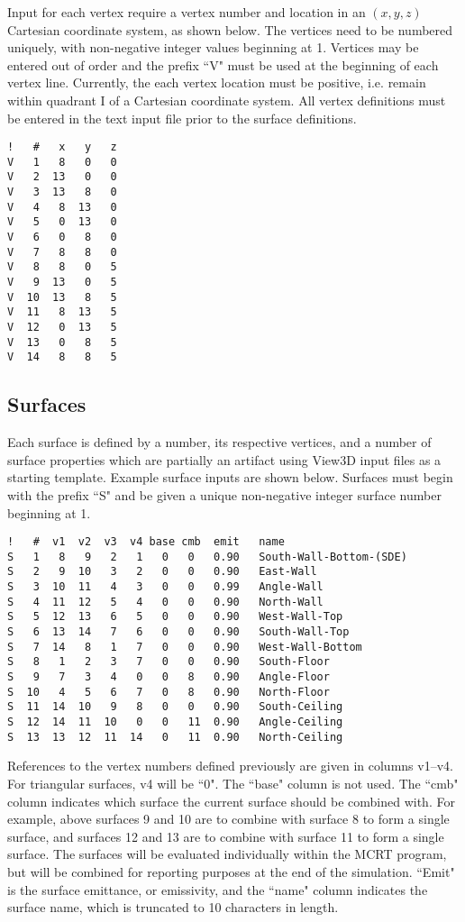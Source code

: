 \documentclass{article}
\begin{document}
Input for each vertex require a vertex number and location in an $(x,y,z)$ Cartesian coordinate system, as shown below. The vertices need to be numbered uniquely, with non-negative integer values beginning at 1. Vertices may be entered out of order and the prefix ``V" must be used at the beginning of each vertex line. Currently, the each vertex location must be positive, i.e. remain within quadrant I of a Cartesian coordinate system. All vertex definitions must be entered in the text input file prior to the surface definitions.

\begin{lstlisting}
!   #   x   y   z
V   1   8   0   0
V   2  13   0   0
V   3  13   8   0
V   4   8  13   0
V   5   0  13   0
V   6   0   8   0
V   7   8   8   0
V   8   8   0   5
V   9  13   0   5
V  10  13   8   5
V  11   8  13   5
V  12   0  13   5
V  13   0   8   5
V  14   8   8   5
\end{lstlisting}

\subsection{Surfaces}
\label{subsec:surfs}
Each surface is defined by a number, its respective vertices, and a number of surface properties which are partially an artifact using View3D input files as a starting template. Example surface inputs are shown below. Surfaces must begin with the prefix ``S" and be given a unique non-negative integer surface number beginning at 1. 
    
\begin{lstlisting}
!   #  v1  v2  v3  v4 base cmb  emit   name
S   1   8   9   2   1   0   0   0.90   South-Wall-Bottom-(SDE)
S   2   9  10   3   2   0   0   0.90   East-Wall
S   3  10  11   4   3   0   0   0.99   Angle-Wall
S   4  11  12   5   4   0   0   0.90   North-Wall
S   5  12  13   6   5   0   0   0.90   West-Wall-Top
S   6  13  14   7   6   0   0   0.90   South-Wall-Top
S   7  14   8   1   7   0   0   0.90   West-Wall-Bottom
S   8   1   2   3   7   0   0   0.90   South-Floor
S   9   7   3   4   0   0   8   0.90   Angle-Floor
S  10   4   5   6   7   0   8   0.90   North-Floor
S  11  14  10   9   8   0   0   0.90   South-Ceiling
S  12  14  11  10   0   0   11  0.90   Angle-Ceiling
S  13  13  12  11  14   0   11  0.90   North-Ceiling
\end{lstlisting}

References to the vertex numbers defined previously are given in columns v1--v4. For triangular surfaces, v4 will be ``0". The ``base" column is not used. The ``cmb" column indicates which surface the current surface should be combined with. For example, above surfaces 9 and 10 are to combine with surface 8 to form a single surface, and surfaces 12 and 13 are to combine with surface 11 to form a single surface. The surfaces will be evaluated individually within the MCRT program, but will be combined for reporting purposes at the end of the simulation. ``Emit" is the surface emittance, or emissivity, and the ``name" column indicates the surface name, which is truncated to 10 characters in length.
\end{document}
